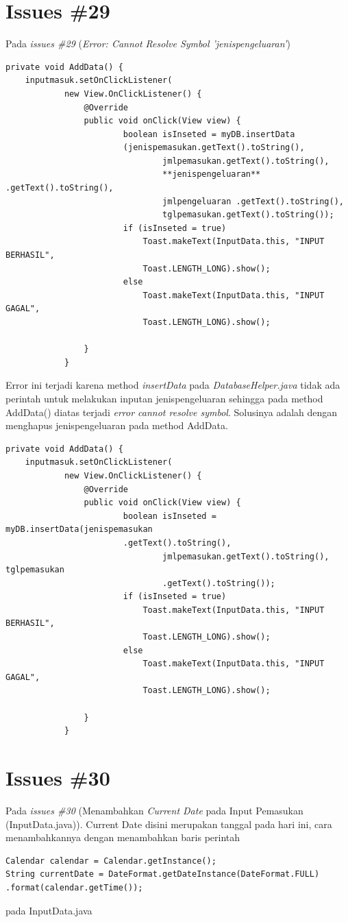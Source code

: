 \section{Issues \#29} 
Pada \textit{issues \#29} (\textit{Error: Cannot Resolve Symbol 'jenispengeluaran'})
\begin{verbatim}
private void AddData() {
    inputmasuk.setOnClickListener(
            new View.OnClickListener() {
                @Override
                public void onClick(View view) {
                        boolean isInseted = myDB.insertData
                        (jenispemasukan.getText().toString(),
                                jmlpemasukan.getText().toString(), 
                                **jenispengeluaran** .getText().toString(),
                                jmlpengeluaran .getText().toString(), 
                                tglpemasukan.getText().toString());
                        if (isInseted = true)
                            Toast.makeText(InputData.this, "INPUT BERHASIL", 
                            Toast.LENGTH_LONG).show();
                        else
                            Toast.makeText(InputData.this, "INPUT GAGAL", 
                            Toast.LENGTH_LONG).show();

                }
            }
\end{verbatim}
Error ini terjadi karena method \textit{insertData} pada \textit{DatabaseHelper.java} tidak ada perintah untuk melakukan inputan jenispengeluaran sehingga pada method AddData() diatas terjadi \textit{error cannot resolve symbol}. Solusinya adalah dengan menghapus jenispengeluaran pada method AddData.
\begin{verbatim}
private void AddData() {
    inputmasuk.setOnClickListener(
            new View.OnClickListener() {
                @Override
                public void onClick(View view) {
                        boolean isInseted = myDB.insertData(jenispemasukan
                        .getText().toString(),
                                jmlpemasukan.getText().toString(), tglpemasukan
                                .getText().toString());
                        if (isInseted = true)
                            Toast.makeText(InputData.this, "INPUT BERHASIL", 
                            Toast.LENGTH_LONG).show();
                        else
                            Toast.makeText(InputData.this, "INPUT GAGAL", 
                            Toast.LENGTH_LONG).show();

                }
            }
\end{verbatim}

\section{Issues \#30}
Pada \textit{issues \#30} (Menambahkan \textit{Current Date} pada Input Pemasukan (InputData.java)). Current Date disini merupakan tanggal pada hari ini, cara menambahkannya dengan menambahkan baris perintah
\begin{verbatim}
Calendar calendar = Calendar.getInstance();
String currentDate = DateFormat.getDateInstance(DateFormat.FULL)
.format(calendar.getTime());
\end{verbatim}
pada InputData.java
